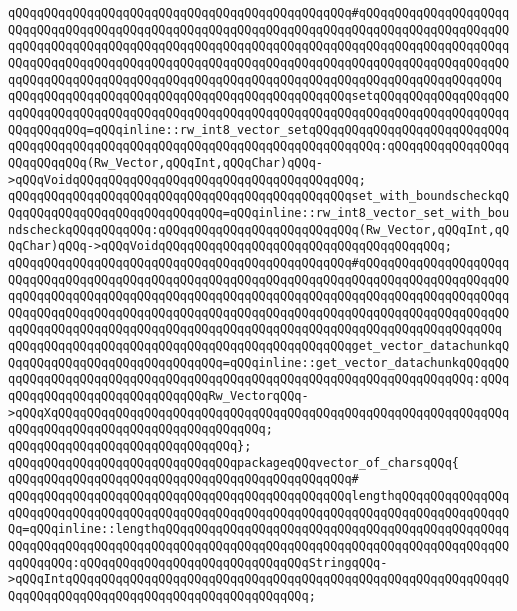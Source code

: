 \verb|qQQqqQQqqQQqqQQqqQQqqQQqqQQqqQQqqQQqqQQqqQQqqQQq#qQQqqQQqqQQqqQQqqQQqqQQqqQQqqQQqqQQqqQQqqQQqqQQqqQQqqQQqqQQqqQQqqQQqqQQqqQQqqQQqqQQqqQQqqQQqqQQqqQQqqQQqqQQqqQQqqQQqqQQqqQQqqQQqqQQqqQQqqQQqqQQqqQQqqQQqqQQqqQQqqQQqqQQqqQQqqQQqqQQqqQQqqQQqqQQqqQQqqQQqqQQqqQQqqQQqqQQqqQQqqQQqqQQqqQQqqQQqqQQqqQQqqQQqqQQqqQQqqQQqqQQqqQQqqQQqqQQqqQQqqQQqqQQqqQQqqQQqqQQq|\newline
\verb|qQQqqQQqqQQqqQQqqQQqqQQqqQQqqQQqqQQqqQQqqQQqqQQqsetqQQqqQQqqQQqqQQqqQQqqQQqqQQqqQQqqQQqqQQqqQQqqQQqqQQqqQQqqQQqqQQqqQQqqQQqqQQqqQQqqQQqqQQqqQQqqQQqqQQq=qQQqinline::rw_int8_vector_setqQQqqQQqqQQqqQQqqQQqqQQqqQQqqQQqqQQqqQQqqQQqqQQqqQQqqQQqqQQqqQQqqQQqqQQqqQQqqQQq:qQQqqQQqqQQqqQQqqQQqqQQqqQQq(Rw_Vector,qQQqInt,qQQqChar)qQQq->qQQqVoidqQQqqQQqqQQqqQQqqQQqqQQqqQQqqQQqqQQqqQQq;|\newline
\verb|qQQqqQQqqQQqqQQqqQQqqQQqqQQqqQQqqQQqqQQqqQQqqQQqset_with_boundscheckqQQqqQQqqQQqqQQqqQQqqQQqqQQqqQQq=qQQqinline::rw_int8_vector_set_with_boundscheckqQQqqQQqqQQq:qQQqqQQqqQQqqQQqqQQqqQQqqQQq(Rw_Vector,qQQqInt,qQQqChar)qQQq->qQQqVoidqQQqqQQqqQQqqQQqqQQqqQQqqQQqqQQqqQQqqQQq;|\newline
\verb|qQQqqQQqqQQqqQQqqQQqqQQqqQQqqQQqqQQqqQQqqQQqqQQq#qQQqqQQqqQQqqQQqqQQqqQQqqQQqqQQqqQQqqQQqqQQqqQQqqQQqqQQqqQQqqQQqqQQqqQQqqQQqqQQqqQQqqQQqqQQqqQQqqQQqqQQqqQQqqQQqqQQqqQQqqQQqqQQqqQQqqQQqqQQqqQQqqQQqqQQqqQQqqQQqqQQqqQQqqQQqqQQqqQQqqQQqqQQqqQQqqQQqqQQqqQQqqQQqqQQqqQQqqQQqqQQqqQQqqQQqqQQqqQQqqQQqqQQqqQQqqQQqqQQqqQQqqQQqqQQqqQQqqQQqqQQqqQQqqQQqqQQqqQQq|\newline
\verb|qQQqqQQqqQQqqQQqqQQqqQQqqQQqqQQqqQQqqQQqqQQqqQQqget_vector_datachunkqQQqqQQqqQQqqQQqqQQqqQQqqQQqqQQq=qQQqinline::get_vector_datachunkqQQqqQQqqQQqqQQqqQQqqQQqqQQqqQQqqQQqqQQqqQQqqQQqqQQqqQQqqQQqqQQqqQQqqQQq:qQQqqQQqqQQqqQQqqQQqqQQqqQQqqQQqRw_VectorqQQq->qQQqXqQQqqQQqqQQqqQQqqQQqqQQqqQQqqQQqqQQqqQQqqQQqqQQqqQQqqQQqqQQqqQQqqQQqqQQqqQQqqQQqqQQqqQQqqQQqqQQqqQQq;|\newline
\verb|qQQqqQQqqQQqqQQqqQQqqQQqqQQqqQQq};|\newline
\newline
\verb|qQQqqQQqqQQqqQQqqQQqqQQqqQQqqQQqpackageqQQqvector_of_charsqQQq{|\newline
\verb|qQQqqQQqqQQqqQQqqQQqqQQqqQQqqQQqqQQqqQQqqQQqqQQq#|\newline
\verb|qQQqqQQqqQQqqQQqqQQqqQQqqQQqqQQqqQQqqQQqqQQqqQQqlengthqQQqqQQqqQQqqQQqqQQqqQQqqQQqqQQqqQQqqQQqqQQqqQQqqQQqqQQqqQQqqQQqqQQqqQQqqQQqqQQqqQQqqQQq=qQQqinline::lengthqQQqqQQqqQQqqQQqqQQqqQQqqQQqqQQqqQQqqQQqqQQqqQQqqQQqqQQqqQQqqQQqqQQqqQQqqQQqqQQqqQQqqQQqqQQqqQQqqQQqqQQqqQQqqQQqqQQqqQQqqQQqqQQq:qQQqqQQqqQQqqQQqqQQqqQQqqQQqqQQqStringqQQq->qQQqIntqQQqqQQqqQQqqQQqqQQqqQQqqQQqqQQqqQQqqQQqqQQqqQQqqQQqqQQqqQQqqQQqqQQqqQQqqQQqqQQqqQQqqQQqqQQqqQQqqQQqqQQq;|\newline

